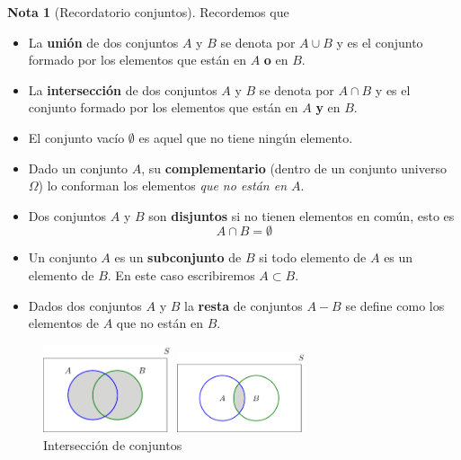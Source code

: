 \documentclass[]{book}
\theoremstyle{plain}
\theoremstyle{definition}
\newtheorem{note}[theorem]{Nota}
\theoremstyle{definition} %
\begin{document}
\begin{note}[Recordatorio conjuntos]
  Recordemos que 
  \begin{itemize}
    \item La \textbf{unión} de dos conjuntos $A$ y $B$ se denota por $A\cup B$ y es el conjunto formado por los 
    elementos que están en $A$ \textbf{o} en $B$.
    \item La \textbf{intersección} de dos conjuntos $A$ y $B$ se denota por $A\cap B$ y es el conjunto formado por los 
    elementos que están en $A$ \textbf{y} en $B$.
    \item El conjunto vacío $\emptyset$ es aquel que no tiene ningún elemento.
    \item Dado un conjunto $A$, su \textbf{complementario} (dentro de un conjunto universo $\Omega$) lo conforman los elementos 
    \emph{que no están en $A$}.
    \item Dos conjuntos $A$ y $B$ son \textbf{disjuntos} si no tienen elementos en común, esto es 
    \[
    A \cap B = \emptyset  
    \]

    \item Un conjunto $A$ es un \textbf{subconjunto} de $B$ si todo elemento de $A$ es un elemento de $B$. En este caso escribiremos
    $A\subset B$.
    
    \item Dados dos conjuntos $A$ y $B$ la \textbf{resta} de conjuntos $A-B$ se define como los elementos de $A$ que no están en $B$.
    \end{itemize}

    \begin{figure}[htbp]
      \begin{minipage}{0.5\linewidth}
      \centering
      \includegraphics[width=1.5in,height=\textheight]{img/union_b.png}
      \caption{Unión de conjuntos}
      \end{minipage}%
      \begin{minipage}{0.5\linewidth}
      \centering
      \includegraphics[width=1.5in,height=\textheight]{img/intersection_b.png}
      \caption{Intersección de conjuntos}
      \end{minipage}


\end{figure}
\end{note}
\end{document}
